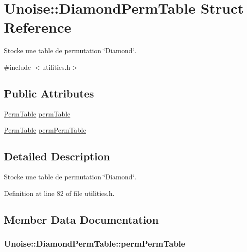 \hypertarget{struct_unoise_1_1_diamond_perm_table}{\section{Unoise\-:\-:Diamond\-Perm\-Table Struct Reference}
\label{struct_unoise_1_1_diamond_perm_table}
}


Stocke une table de permutation \char`\"{}\-Diamond\char`\"{}.  




{\ttfamily \#include $<$utilities.\-h$>$}

\subsection*{Public Attributes}
\begin{DoxyCompactItemize}
\item 
\hyperlink{namespace_unoise_ae11142038f2dd1bea2711b2b99bbfaf6}{Perm\-Table} \hyperlink{struct_unoise_1_1_diamond_perm_table_abbdd2c631912b46dd642a1742fafc2cc}{perm\-Table}
\item 
\hyperlink{namespace_unoise_ae11142038f2dd1bea2711b2b99bbfaf6}{Perm\-Table} \hyperlink{struct_unoise_1_1_diamond_perm_table_a5445920a0bda0d71a2523175fb125df4}{perm\-Perm\-Table}
\end{DoxyCompactItemize}


\subsection{Detailed Description}
Stocke une table de permutation \char`\"{}\-Diamond\char`\"{}. 

Definition at line 82 of file utilities.\-h.



\subsection{Member Data Documentation}
\hypertarget{struct_unoise_1_1_diamond_perm_table_a5445920a0bda0d71a2523175fb125df4}{
\subsubsection[{perm\-Perm\-Table}]{ Unoise\-::\-Diamond\-Perm\-Table\-::perm\-Perm\-Table}}\label{struct_unoise_1_1_diamond_perm_table_a5445920a0bda0d71a2523175fb125df4}


